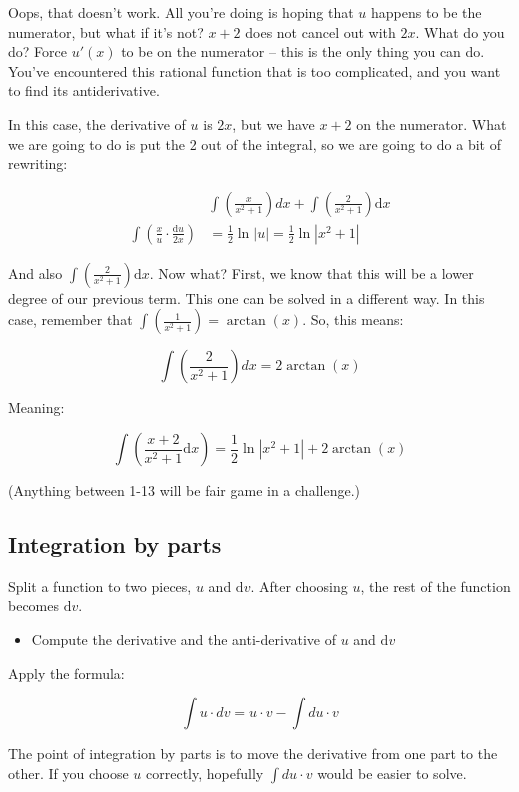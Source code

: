 \documentclass[12pt]{article}
\theoremstyle{plain}
\theoremstyle{remark}
\theoremstyle{definition}
\begin{document}
Oops, that doesn't work. All you're doing is hoping that \(u\) happens
to be the numerator, but what if it's not? \(x + 2\) does not cancel out
with \(2x\). What do you do? Force \(u'(x)\) to be on the numerator
-- this is the only thing you can do. You've encountered this rational
function that is too complicated, and you want to find its
antiderivative.

In this case, the derivative of \(u\) is \(2x\), but we have \(x + 2\)
on the numerator. What we are going to do is put the 2 out of the
integral, so we are going to do a bit of rewriting:

\begin{align*}
&\int\left( \frac{x}{x^{2} + 1} \right)dx + \int\left( \frac{2}{x^{2} + 1} \right)\text{d}x \\
\int\left( \frac{x}{u} \cdot \frac{\text{d}u}{2x} \right) &= \frac{1}{2}\ln|u| = \frac{1}{2}\ln\left| x^{2} + 1 \right|
\end{align*}


And also \(\int\left( \frac{2}{x^{2} + 1} \right)\text{d}x\). Now what?
First, we know that this will be a lower degree of our previous term.
This one can be solved in a different way. In this case, remember that
\(\int\left( \frac{1}{x^{2} + 1} \right) = \arctan(x)\). So, this means:

\[\int\left( \frac{2}{x^{2} + 1} \right)dx = 2\arctan(x)\]

Meaning:

\[\int\left( \frac{x + 2}{x^{2} + 1}\text{d}x \right) = \frac{1}{2}\ln\left| x^{2} + 1 \right| + 2\arctan(x)\]

(Anything between 1-13 will be fair game in a challenge.)


\subsection{Integration by parts}

Split a function to two pieces, \(u\) and \(\text{d}v\). After choosing
\(u\), the rest of the function becomes \(\text{d}v\).

\begin{itemize}
\item
  Compute the derivative and the anti-derivative of \(u\) and
  \(\text{d}v\)
\end{itemize}

Apply the formula:

\[\int u \cdot dv = u \cdot v - \int du \cdot v\]

The point of integration by parts is to move the derivative from one
part to the other. If you choose \(u\) correctly, hopefully
\(\int du \cdot v\) would be easier to solve.
\end{document}
